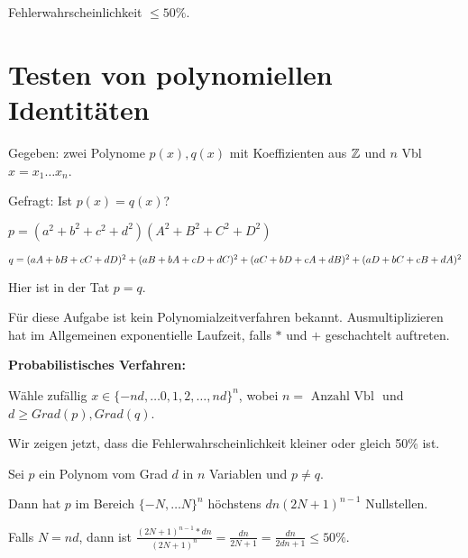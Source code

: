 Fehlerwahrscheinlichkeit $\leq 50\%$.





\section{Testen von polynomiellen Identitäten}

Gegeben: zwei Polynome $p(x), q(x)$ mit Koeffizienten aus $\mathbb{Z}$ und $n$ Vbl $x = x_1 \dots x_n$.

Gefragt: Ist $p(x) = q(x)$?


\begin{beispiel}

    $p = (a^2 + b^2 + c^2 + d^2)(A^2 + B^2 + C^2 + D^2)$

    $q = (aA + bB + cC + dD)^2 + \\
         (aB + bA + cD + dC)^2 + \\
         (aC + bD + cA + dB)^2 + \\
         (aD + bC + cB + dA)^2 \\
    $

    Hier ist in der Tat $p = q$.

\end{beispiel}

Für diese Aufgabe ist kein Polynomialzeitverfahren bekannt.
Ausmultiplizieren hat im Allgemeinen exponentielle Laufzeit, falls $*$ und $+$ geschachtelt auftreten.



\textbf{Probabilistisches Verfahren:}

Wähle zufällig $x \in \{-nd, \dots 0, 1, 2, \dots , nd\}^n$,
wobei $n = \text{ Anzahl Vbl } $ und $  d \geq Grad(p), Grad(q)$.

Wir zeigen jetzt, dass die Fehlerwahrscheinlichkeit kleiner oder gleich 50\% ist.

\begin{lemma}


    Sei $p$ ein Polynom vom Grad $d$ in $n$ Variablen und $p \neq q$.

    Dann hat $p$ im Bereich $\{-N, \dots N\}^n$ höchstens $dn(2N+1)^{n-1}$ Nullstellen.

\end{lemma}

Falls $N = nd$, dann ist $\frac{(2N+1)^{n-1} * dn}{(2N+1)^n}  =  \frac{dn}{2N+1} = \frac{dn}{2dn+1} \leq 50\%$.








